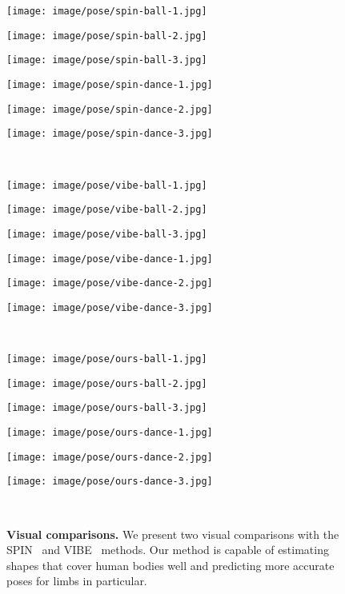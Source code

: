 \documentclass[times,referee,twocolumn,final,authoryear]{elsarticle}
\newcommand{\mpage}[2]
{
\begin{minipage}{#1\textwidth}\centering
#2
\end{minipage}
}
\begin{document}
\begin{figure*}[t]
  \begin{center}
  \mpage{0.01}{}
  \mpage{0.1485}{\texttt{[image: image/pose/spin-ball-1.jpg]}} \hfill
  \mpage{0.1485}{\texttt{[image: image/pose/spin-ball-2.jpg]}} \hfill
  \mpage{0.1485}{\texttt{[image: image/pose/spin-ball-3.jpg]}} \hfill
  \mpage{0.01}{} \hfill
  \mpage{0.1485}{\texttt{[image: image/pose/spin-dance-1.jpg]}} \hfill
  \mpage{0.1485}{\texttt{[image: image/pose/spin-dance-2.jpg]}} \hfill
  \mpage{0.1485}{\texttt{[image: image/pose/spin-dance-3.jpg]}} \\
  \vspace{2.0mm}
  \mpage{0.01}{}
  \mpage{0.1485}{\texttt{[image: image/pose/vibe-ball-1.jpg]}} \hfill
  \mpage{0.1485}{\texttt{[image: image/pose/vibe-ball-2.jpg]}} \hfill
  \mpage{0.1485}{\texttt{[image: image/pose/vibe-ball-3.jpg]}} \hfill
  \mpage{0.01}{} \hfill
  \mpage{0.1485}{\texttt{[image: image/pose/vibe-dance-1.jpg]}} \hfill
  \mpage{0.1485}{\texttt{[image: image/pose/vibe-dance-2.jpg]}} \hfill
  \mpage{0.1485}{\texttt{[image: image/pose/vibe-dance-3.jpg]}} \\
  \vspace{2.0mm}
  \mpage{0.01}{}
  \mpage{0.1485}{\texttt{[image: image/pose/ours-ball-1.jpg]}} \hfill
  \mpage{0.1485}{\texttt{[image: image/pose/ours-ball-2.jpg]}} \hfill
  \mpage{0.1485}{\texttt{[image: image/pose/ours-ball-3.jpg]}} \hfill
  \mpage{0.01}{} \hfill
  \mpage{0.1485}{\texttt{[image: image/pose/ours-dance-1.jpg]}} \hfill
  \mpage{0.1485}{\texttt{[image: image/pose/ours-dance-2.jpg]}} \hfill
  \mpage{0.1485}{\texttt{[image: image/pose/ours-dance-3.jpg]}} \\
  \vspace{-1.5mm}
  \caption{
  \textbf{Visual comparisons.} 
We present two visual comparisons with the SPIN~\citep{SPIN} and VIBE~\citep{VIBE} methods.
Our method is capable of estimating shapes that cover human bodies well and predicting more accurate poses for limbs in particular.
  }
  \label{fig:comparison}
  \end{center}
  \vspace{-8.0mm}
\end{figure*}
\end{document}
